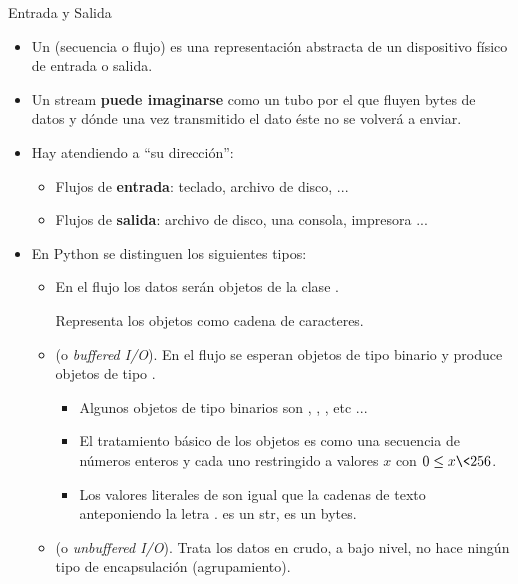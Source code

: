 \documentclass[10pt, envcountsect , spanish]{beamer}
\begin{document}
\begin{frame}{Entrada y Salida} 
\begin{itemize}
\item Un  (secuencia o flujo) es  una representación abstracta de un dispositivo físico de entrada o salida. 

\item Un stream \textbf{puede imaginarse} como un tubo por el que fluyen bytes de datos y dónde una vez transmitido el dato éste no se volverá a enviar.

\item Hay  atendiendo a ``su dirección'': 
\begin{itemize}
\item Flujos de \textbf{entrada}: teclado, archivo de disco, ...
\item Flujos de \textbf{salida}: archivo de disco, una consola, impresora ...
\end{itemize}

\item En Python se distinguen los siguientes tipos:
\begin{itemize}
\item {} En el flujo los datos serán objetos de la clase .

Representa los objetos como cadena de caracteres.

\item {} (o \textit{buffered I/O}). En el flujo se esperan objetos de tipo binario y produce objetos de tipo .

\begin{itemize}
\item Algunos objetos de tipo binarios son , , , etc ...
\item El tratamiento básico de los objetos  es como una secuencia  de números enteros y cada uno restringido a valores $x$ con $0\leq x\< 256$.
\item Los valores literales de  son igual que la cadenas de texto anteponiendo la letra .
	\unEjemplo {} es un str,   es un bytes.
\end{itemize}



\item {} (o \textit{unbuffered I/O}). Trata los datos en crudo, a bajo nivel, no hace ningún tipo de encapsulación (agrupamiento).
\end{itemize}

\end{itemize}
\end{frame}
\end{document}
